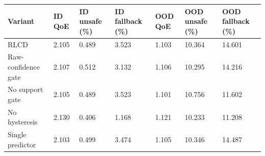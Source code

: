 \begin{tabular}{lllllll}
\toprule
Variant & ID QoE & ID unsafe (\%) & ID fallback (\%) & OOD QoE & OOD unsafe (\%) & OOD fallback (\%) \\
\midrule
RLCD & 2.105 & 0.489 & 3.523 & 1.103 & 10.364 & 14.601 \\
Raw-confidence gate & 2.107 & 0.512 & 3.132 & 1.106 & 10.295 & 14.216 \\
No support gate & 2.105 & 0.489 & 3.523 & 1.101 & 10.756 & 11.602 \\
No hysteresis & 2.130 & 0.406 & 1.168 & 1.121 & 10.233 & 11.208 \\
Single predictor & 2.103 & 0.499 & 3.474 & 1.105 & 10.346 & 14.487 \\
\bottomrule
\end{tabular}
